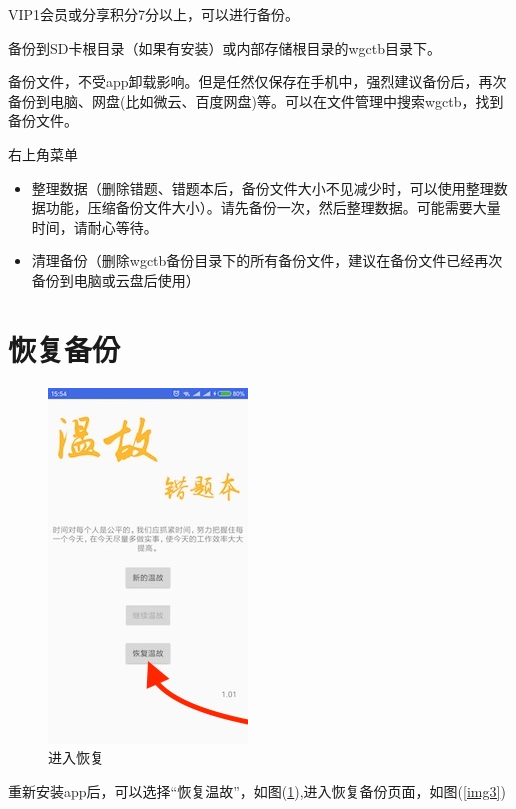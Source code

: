 VIP1会员或分享积分7分以上，可以进行备份。

备份到SD卡根目录（如果有安装）或内部存储根目录的wgctb目录下。

备份文件，不受app卸载影响。但是任然仅保存在手机中，强烈建议备份后，再次备份到电脑、网盘(比如微云、百度网盘)等。可以在文件管理中搜索wgctb，找到备份文件。\newline

右上角菜单
\begin{itemize}
	\item 整理数据（删除错题、错题本后，备份文件大小不见减少时，可以使用整理数据功能，压缩备份文件大小）。请先备份一次，然后整理数据。可能需要大量时间，请耐心等待。
	\item 清理备份（删除wgctb备份目录下的所有备份文件，建议在备份文件已经再次备份到电脑或云盘后使用）
\end{itemize}

\section{恢复备份}
\label{restore}
\begin{figure}[H]
	\centering
	\includegraphics{img/2.jpg}
	\caption{进入恢复}
	\label{img2}
\end{figure}

重新安装app后，可以选择“恢复温故”，如图(\ref{img2}),进入恢复备份页面，如图(\ref{img3})


